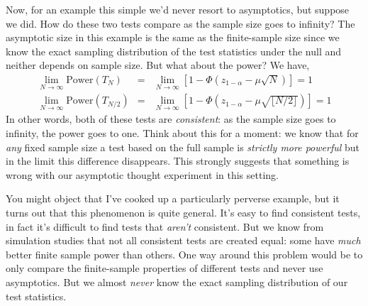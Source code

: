 \documentclass[12pt]{article}
\theoremstyle{definition}
\begin{document}
Now, for an example this simple we'd never resort to asymptotics, but suppose we did. How do these two tests compare as the sample size goes to infinity? The asymptotic size in this example is the same as the finite-sample size since we know the exact sampling distribution of the test statistics under the null and neither depends on sample size. But what about the power? We have,
\begin{eqnarray*}
	\lim_{N\rightarrow \infty} \mbox{Power}(T_{N}) &=& \lim_{N\rightarrow \infty}\left[1 - \Phi\left(z_{1-\alpha} - \mu\sqrt{N}\right) \right] = 1\\
	\lim_{N\rightarrow \infty} \mbox{Power}(T_{N/2}) &=& \lim_{N\rightarrow \infty}\left[1 - \Phi\left(z_{1-\alpha} - \mu\sqrt{\lfloor N/2 \rfloor }\right) \right] = 1
\end{eqnarray*}
In other words, both of these tests are \emph{consistent}: as the sample size goes to infinity, the power goes to one. Think about this for a moment: we know that for \emph{any} fixed sample size a test based on the full sample is \emph{strictly more powerful} but in the limit this difference disappears. This strongly suggests that something is wrong with our asymptotic thought experiment in this setting.

You might object that I've cooked up a particularly perverse example, but it turns out that this phenomenon is quite general. It's easy to find consistent tests, in fact it's difficult to find tests that \emph{aren't} consistent. But we know from simulation studies that not all consistent tests are created equal: some have \emph{much} better finite sample power than others. One way around this problem would be to only compare the finite-sample properties of different tests and never use asymptotics. But we almost \emph{never} know the exact sampling distribution of our test statistics. 
\end{document}
